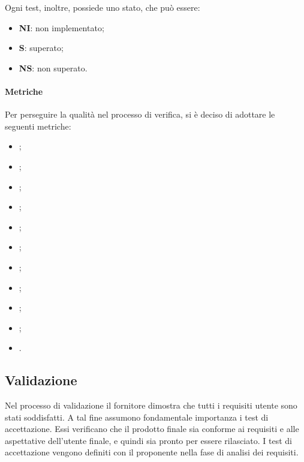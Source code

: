 Ogni test, inoltre, possiede uno stato, che può essere:
\begin{itemize}
      \item \textbf{NI}: non implementato;
      \item \textbf{S}: superato;
      \item \textbf{NS}: non superato.
\end{itemize}
\paragraph{Metriche}
Per perseguire la qualità nel processo di verifica, si è deciso di adottare le
seguenti metriche:
\begin{itemize}
      \item {};
      \item {};
      \item {};
      \item {};
      \item {};
      \item {};
      \item {};
      \item {};
      \item {};
      \item {};
      \item {}.
\end{itemize}
\subsection{Validazione}
Nel processo di validazione il fornitore dimostra che tutti i requisiti utente
sono stati soddisfatti. A tal fine assumono fondamentale importanza
i test di accettazione. Essi verificano che il prodotto finale sia conforme ai requisiti e
alle aspettative dell'utente finale, e quindi sia pronto per essere rilasciato.
I test di accettazione vengono definiti con il proponente nella fase di analisi dei requisiti.
